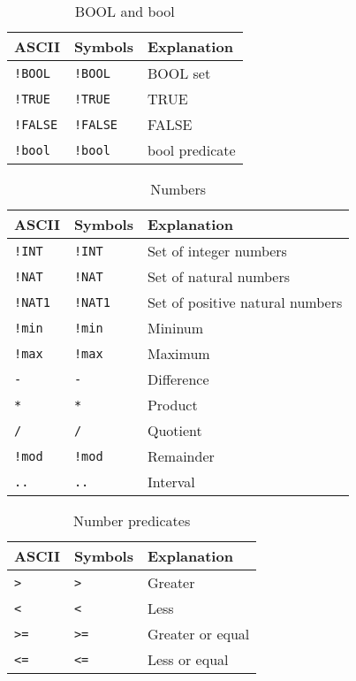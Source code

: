 \begin{EventBNoShortInline}
  
  \begin{table}[!htbp]
    \centering
    \begin{tabular}{|l|l|l|}
      \hline
      ASCII & Symbols & Explanation \\
      \hline
      \verb$!BOOL$ & \lstinline$!BOOL$ & BOOL set \\
      \verb$!TRUE$ & \lstinline$!TRUE$ & TRUE \\
      \verb$!FALSE$ & \lstinline$!FALSE$ & FALSE \\
      \verb$!bool$ & \lstinline$!bool$ & bool predicate \\
      \hline
    \end{tabular}
    \caption{BOOL and bool}
  \end{table}
  
  \begin{table}[!htbp]
    \centering
    \begin{tabular}{|l|l|l|}
      \hline
      ASCII & Symbols & Explanation \\
      \hline
      \verb$!INT$ & \lstinline$!INT$ & Set of integer numbers \\
      \verb$!NAT$ & \lstinline$!NAT$ & Set of natural numbers \\
      \verb$!NAT1$ & \lstinline$!NAT1$ & Set of positive natural numbers \\
      \verb$!min$ & \lstinline$!min$ & Mininum \\
      \verb$!max$ & \lstinline$!max$ & Maximum \\
      \verb$-$ & \lstinline$-$ & Difference \\
      \verb$*$ & \lstinline$*$ & Product \\
      \verb$/$ & \lstinline$/$ & Quotient \\
      \verb$!mod$ & \lstinline$!mod$ & Remainder \\
      \verb$..$ & \lstinline$..$ & Interval  \\
      \hline
    \end{tabular}
    \caption{Numbers}
  \end{table}
  
  \begin{table}[!htbp]
    \centering
    \begin{tabular}{|l|l|l|}
      \hline
      ASCII & Symbols & Explanation \\
      \hline
      \verb$>$ & \lstinline$>$ & Greater \\
      \verb$<$ & \lstinline$<$ & Less \\
      \verb$>=$ & \lstinline$>=$ & Greater or equal \\
      \verb$<=$ & \lstinline$<=$ & Less or equal \\
      \hline
    \end{tabular}
    \caption{Number predicates}
  \end{table}
  

\end{EventBNoShortInline}
